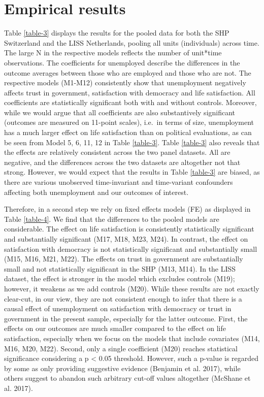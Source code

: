 \documentclass[12pt,]{article}
\begin{document}
\hypertarget{sec:results}{%
\section{Empirical results}\label{sec:results}}

Table \ref{table-3} displays the results for the pooled data for both the SHP Switzerland and the LISS Netherlands, pooling all units (individuals) across time. The large N in the respective models reflects the number of unit*time observations. The coefficients for unemployed describe the differences in the outcome averages between those who are employed and those who are not. The respective models (M1-M12) consistently show that unemployment negatively affects trust in government, satisfaction with democracy and life satisfaction. All coefficients are statistically significant both with and without controls. Moreover, while we would argue that all coefficients are also substantively significant (outcomes are measured on 11-point scales), i.e.~in terms of size, unemployment has a much larger effect on life satisfaction than on political evaluations, as can be seen from Model 5, 6, 11, 12 in Table \ref{table-3}. Table \ref{table-3} also reveals that the effects are relatively consistent across the two panel datasets. All are negative, and the differences across the two datasets are altogether not that strong. However, we would expect that the results in Table \ref{table-3} are biased, as there are various unobserved time-invariant and time-variant confounders affecting both unemployment and our outcomes of interest.



Therefore, in a second step we rely on fixed effects models (FE) as displayed in Table \ref{table-4}. We find that the differences to the pooled models are considerable. The effect on life satisfaction is consistently statistically significant and substantially significant (M17, M18, M23, M24). In contrast, the effect on satisfaction with democracy is not statistically significant and substantially small (M15, M16, M21, M22). The effects on trust in government are substantially small and not statistically significant in the SHP (M13, M14). In the LISS dataset, the effect is stronger in the model which excludes controls (M19); however, it weakens as we add controls (M20). While these results are not exactly clear-cut, in our view, they are not consistent enough to infer that there is a causal effect of unemployment on satisfaction with democracy or trust in government in the present sample, especially for the latter outcome. First, the effects on our outcomes are much smaller compared to the effect on life satisfaction, especially when we focus on the models that include covariates (M14, M16, M20, M22). Second, only a single coefficient (M20) reaches statistical significance considering a p \textless{} 0.05 threshold. However, such a p-value is regarded by some as only providing suggestive evidence (Benjamin et al. 2017), while others suggest to abandon such arbitrary cut-off values altogether (McShane et al. 2017).
\end{document}
